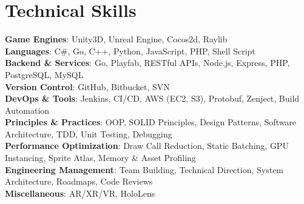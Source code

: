 \documentclass[letterpaper,11pt]{article}
\begin{document}
\section{Technical Skills}
    \vspace{2pt}
         \begin{itemize}[leftmargin=0.02in, label={}]
            \small{\item{
             \textbf{Game Engines}{: Unity3D, Unreal Engine, Cocos2d, Raylib} \\[1mm]
             \textbf{Languages}{: C\#, Go, C++, Python, JavaScript, PHP, Shell Script} \\[1mm]
             \textbf{Backend \& Services}{: Go, Playfab, RESTful APIs, Node.js, Express, PHP, PostgreSQL, MySQL} \\[1mm]
             \textbf{Version Control}{: GitHub, Bitbucket, SVN} \\[1mm]
             \textbf{DevOps \& Tools}{: Jenkins, CI/CD, AWS (EC2, S3), Protobuf, Zenject, Build Automation} \\[1mm]
             \textbf{Principles \& Practices}{: OOP, SOLID Principles, Design Patterns, Software Architecture, TDD, Unit Testing, Debugging} \\[1mm]
             \textbf{Performance Optimization}{: Draw Call Reduction, Static Batching, GPU Instancing, Sprite Atlas, Memory \& Asset Profiling} \\[1mm]
             \textbf{Engineering Management}{: Team Building, Technical Direction, System Architecture, Roadmaps, Code Reviews} \\[1mm]
             \textbf{Miscellaneous}{: AR/XR/VR, HoloLens} \\[1mm]
            }}
         \end{itemize}
 \vspace{-1pt}
 
\end{document}
